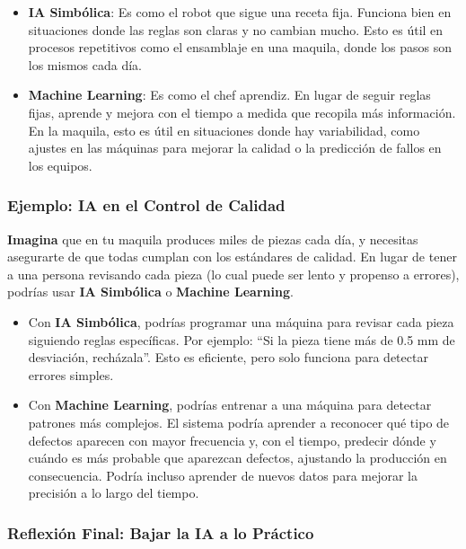 \documentclass[
  10pt,
  letterpaper,
]{book}
\begin{document}
\begin{itemize}
\item
  \textbf{IA Simbólica}: Es como el robot que sigue una receta fija.
  Funciona bien en situaciones donde las reglas son claras y no cambian
  mucho. Esto es útil en procesos repetitivos como el ensamblaje en una
  maquila, donde los pasos son los mismos cada día.
\item
  \textbf{Machine Learning}: Es como el chef aprendiz. En lugar de
  seguir reglas fijas, aprende y mejora con el tiempo a medida que
  recopila más información. En la maquila, esto es útil en situaciones
  donde hay variabilidad, como ajustes en las máquinas para mejorar la
  calidad o la predicción de fallos en los equipos.
\end{itemize}

\subsubsection{Ejemplo: IA en el Control de
Calidad}\label{ejemplo-ia-en-el-control-de-calidad}

\textbf{Imagina} que en tu maquila produces miles de piezas cada día, y
necesitas asegurarte de que todas cumplan con los estándares de calidad.
En lugar de tener a una persona revisando cada pieza (lo cual puede ser
lento y propenso a errores), podrías usar \textbf{IA Simbólica} o
\textbf{Machine Learning}.

\begin{itemize}
\item
  Con \textbf{IA Simbólica}, podrías programar una máquina para revisar
  cada pieza siguiendo reglas específicas. Por ejemplo: ``Si la pieza
  tiene más de 0.5 mm de desviación, recházala''. Esto es eficiente,
  pero solo funciona para detectar errores simples.
\item
  Con \textbf{Machine Learning}, podrías entrenar a una máquina para
  detectar patrones más complejos. El sistema podría aprender a
  reconocer qué tipo de defectos aparecen con mayor frecuencia y, con el
  tiempo, predecir dónde y cuándo es más probable que aparezcan
  defectos, ajustando la producción en consecuencia. Podría incluso
  aprender de nuevos datos para mejorar la precisión a lo largo del
  tiempo.
\end{itemize}

\subsubsection{Reflexión Final: Bajar la IA a lo
Práctico}\label{reflexiuxf3n-final-bajar-la-ia-a-lo-pruxe1ctico}
\end{document}

